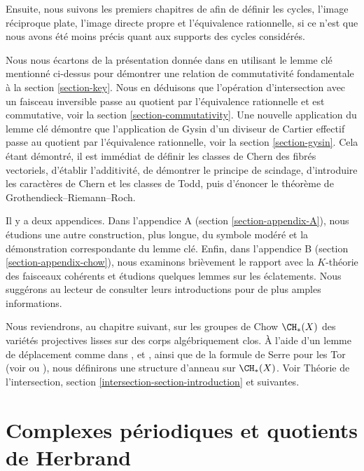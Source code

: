 \medskip\noindent
Ensuite, nous suivons les premiers chapitres de \cite{F} afin de définir
les cycles, l'image réciproque plate, l'image directe propre et l'équivalence rationnelle,
si ce n'est que nous avons été moins précis quant aux supports des cycles
considérés.

\medskip\noindent
Nous nous écartons de la présentation donnée dans \cite{F} en utilisant le
lemme clé mentionné ci-dessus pour démontrer une relation de commutativité fondamentale à la
section \ref{section-key}. Nous en déduisons que l'opération
d'intersection avec un faisceau inversible passe au quotient par l'équivalence
rationnelle et est commutative, voir la section \ref{section-commutativity}.
Une nouvelle application du lemme
clé démontre que l'application de Gysin d'un diviseur de Cartier effectif
passe au quotient par l'équivalence rationnelle, voir la section \ref{section-gysin}.
Cela étant démontré, il est immédiat de définir les classes de Chern
des fibrés vectoriels, d'établir l'additivité, de démontrer le principe de scindage,
d'introduire les caractères de Chern et les classes de Todd, puis d'énoncer le
théorème de Grothendieck--Riemann--Roch.

\medskip\noindent
Il y a deux appendices. Dans l'appendice A (section \ref{section-appendix-A}),
nous étudions une autre construction, plus longue, du
symbole modéré et la démonstration correspondante du lemme clé.
Enfin, dans l'appendice B (section \ref{section-appendix-chow}),
nous examinons brièvement le rapport avec la $K$-théorie des faisceaux
cohérents et étudions quelques lemmes sur les éclatements.
Nous suggérons au lecteur de consulter leurs introductions pour
de plus amples informations.

\medskip\noindent
Nous reviendrons, au chapitre suivant, sur les groupes de Chow $\CH_*(X)$ des variétés projectives lisses
sur des corps algébriquement clos. À l'aide d'un lemme de déplacement
comme dans \cite{Samuel}, \cite{ChevalleyI} et \cite{ChevalleyII},
ainsi que de la formule de Serre pour les Tor
(voir \cite{Serre_local_algebra} ou \cite{Serre_algebre_locale}),
nous définirons une structure d'anneau sur $\CH_*(X)$. Voir
Théorie de l'intersection, section \ref{intersection-section-introduction} et suivantes.








\section{Complexes périodiques et quotients de Herbrand}
\label{section-periodic-complexes}

